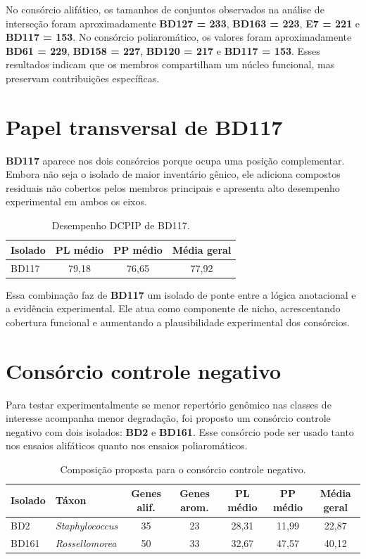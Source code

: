 \documentclass[12pt,a4paper]{article}
\begin{document}
No consórcio alifático, os tamanhos de conjuntos observados na análise de interseção foram aproximadamente \textbf{BD127 = 233}, \textbf{BD163 = 223}, \textbf{E7 = 221} e \textbf{BD117 = 153}. No consórcio poliaromático, os valores foram aproximadamente \textbf{BD61 = 229}, \textbf{BD158 = 227}, \textbf{BD120 = 217} e \textbf{BD117 = 153}. Esses resultados indicam que os membros compartilham um núcleo funcional, mas preservam contribuições específicas.

\section{Papel transversal de BD117}

\textbf{BD117} aparece nos dois consórcios porque ocupa uma posição complementar. Embora não seja o isolado de maior inventário gênico, ele adiciona compostos residuais não cobertos pelos membros principais e apresenta alto desempenho experimental em ambos os eixos.

\begin{table}[H]
\centering
\caption{Desempenho DCPIP de BD117.}
\begin{tabular}{lccc}
\toprule
\textbf{Isolado} & \textbf{PL médio} & \textbf{PP médio} & \textbf{Média geral} \\
\midrule
BD117 & 79,18 & 76,65 & 77,92 \\
\bottomrule
\end{tabular}
\end{table}

Essa combinação faz de \textbf{BD117} um isolado de ponte entre a lógica anotacional e a evidência experimental. Ele atua como componente de nicho, acrescentando cobertura funcional e aumentando a plausibilidade experimental dos consórcios.

\section{Consórcio controle negativo}

Para testar experimentalmente se menor repertório genômico nas classes de interesse acompanha menor degradação, foi proposto um consórcio controle negativo com dois isolados: \textbf{BD2} e \textbf{BD161}. Esse consórcio pode ser usado tanto nos ensaios alifáticos quanto nos ensaios poliaromáticos.

\begin{table}[H]
\centering
\small
\caption{Composição proposta para o consórcio controle negativo.}
\begin{tabular}{llccccc}
\toprule
\textbf{Isolado} & \textbf{Táxon} & \textbf{Genes alif.} & \textbf{Genes arom.} & \textbf{PL médio} & \textbf{PP médio} & \textbf{Média geral} \\
\midrule
BD2 & \textit{Staphylococcus} & 35 & 23 & 28,31 & 11,99 & 22,87 \\
BD161 & \textit{Rossellomorea} & 50 & 33 & 32,67 & 47,57 & 40,12 \\
\bottomrule
\end{tabular}
\normalsize
\end{table}
\end{document}
